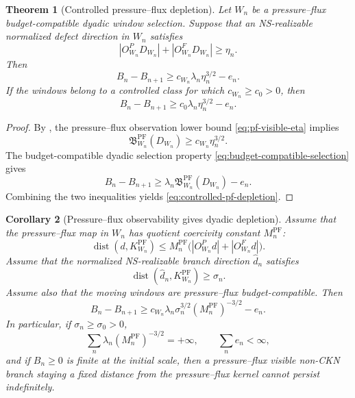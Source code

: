 \documentclass[11pt]{article}
\numberwithin{equation}{section}
\theoremstyle{plain}
\newtheorem{theorem}{Theorem}[section]
\newtheorem{corollary}[theorem]{Corollary}
\theoremstyle{definition}
\theoremstyle{remark}
\newcommand{\PF}{\mathrm{PF}}
\newcommand{\dist}{\operatorname{dist}}
\newcommand{\bfB}{\mathfrak B}
\begin{document}
\begin{theorem}[Controlled pressure--flux depletion]
\label{thm:controlled-pf-depletion}
Let \(W_n\) be a pressure--flux budget-compatible dyadic window selection.  Suppose that an NS-realizable normalized defect direction in \(W_n\) satisfies
\begin{equation}
        |O^P_{W_n}D_{W_n}|+|O^F_{W_n}D_{W_n}|
        \ge
        \eta_n.
        \label{eq:pf-visible-eta}
\end{equation}
Then
\begin{equation}
        B_n-B_{n+1}
        \ge
        c_{W_n}\lambda_n\eta_n^{3/2}-e_n.
        \label{eq:controlled-pf-depletion}
\end{equation}
If the windows belong to a controlled class for which \(c_{W_n}\ge c_0>0\), then
\[
        B_n-B_{n+1}
        \ge
        c_0\lambda_n\eta_n^{3/2}-e_n.
\]
\end{theorem}

\begin{proof}
By , the pressure--flux observation lower bound \eqref{eq:pf-visible-eta} implies
\[
        \bfB^{\PF}_{W_n}(D_{W_n})
        \ge
        c_{W_n}\eta_n^{3/2}.
\]
The budget-compatible dyadic selection property \eqref{eq:budget-compatible-selection} gives
\[
        B_n-B_{n+1}
        \ge
        \lambda_n\bfB^{\PF}_{W_n}(D_{W_n})-e_n.
\]
Combining the two inequalities yields \eqref{eq:controlled-pf-depletion}.
\end{proof}


\begin{corollary}[Pressure--flux observability gives dyadic depletion]
\label{cor:pf-observability-gives-depletion}
Assume that the pressure--flux map in \(W_n\) has quotient coercivity constant \(M^{\PF}_n\):
\[
        \dist(d,K^{\PF}_{W_n})
        \le
        M^{\PF}_n
        \bigl(|O^P_{W_n}d|+|O^F_{W_n}d|\bigr).
\]
Assume that the normalized NS-realizable branch direction \(\widehat d_n\) satisfies
\[
        \dist(\widehat d_n,K^{\PF}_{W_n})\ge\sigma_n.
\]
Assume also that the moving windows are pressure--flux budget-compatible.  Then
\begin{equation}
        B_n-B_{n+1}
        \ge
        c_{W_n}\lambda_n\sigma_n^{3/2}(M^{\PF}_n)^{-3/2}-e_n.
        \label{eq:pf-observability-depletion}
\end{equation}
In particular, if \(\sigma_n\ge\sigma_0>0\),
\[
        \sum_n\lambda_n(M^{\PF}_n)^{-3/2}=+\infty,
        \qquad
        \sum_n e_n<\infty,
\]
and if \(B_n\ge0\) is finite at the initial scale, then a pressure--flux visible non-CKN branch staying a fixed distance from the pressure--flux kernel cannot persist indefinitely.
\end{corollary}
\end{document}
